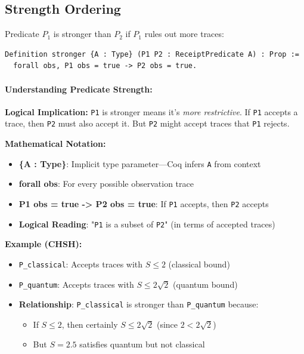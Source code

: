 \subsection{Strength Ordering}

Predicate $P_1$ is stronger than $P_2$ if $P_1$ rules out more traces:
\begin{lstlisting}
Definition stronger {A : Type} (P1 P2 : ReceiptPredicate A) : Prop :=
  forall obs, P1 obs = true -> P2 obs = true.
\end{lstlisting}

\paragraph{Understanding Predicate Strength:}
\textbf{Logical Implication:} \texttt{P1} is stronger means it's \emph{more restrictive}. If \texttt{P1} accepts a trace, then \texttt{P2} must also accept it. But \texttt{P2} might accept traces that \texttt{P1} rejects.

\textbf{Mathematical Notation:}
\begin{itemize}
    \item \textbf{\{A : Type\}}: Implicit type parameter—Coq infers \texttt{A} from context
    \item \textbf{forall obs}: For every possible observation trace
    \item \textbf{P1 obs = true -> P2 obs = true}: If \texttt{P1} accepts, then \texttt{P2} accepts
    \item \textbf{Logical Reading}: "\texttt{P1} is a subset of \texttt{P2}" (in terms of accepted traces)
\end{itemize}

\textbf{Example (CHSH):}
\begin{itemize}
    \item \texttt{P\_classical}: Accepts traces with $S \leq 2$ (classical bound)
    \item \texttt{P\_quantum}: Accepts traces with $S \leq 2\sqrt{2}$ (quantum bound)
    \item \textbf{Relationship}: \texttt{P\_classical} is stronger than \texttt{P\_quantum} because:
    \begin{itemize}
        \item If $S \leq 2$, then certainly $S \leq 2\sqrt{2}$ (since $2 < 2\sqrt{2}$)
        \item But $S = 2.5$ satisfies quantum but not classical
    \end{itemize}
\end{itemize}

